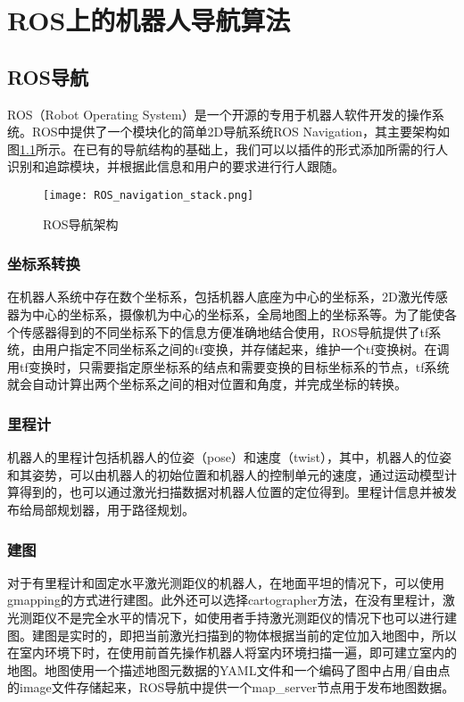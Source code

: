 
\chapter{ROS上的机器人导航算法}

\section{ROS导航}

ROS（Robot Operating System）是一个开源的专用于机器人软件开发的操作系统。ROS中提供了一个模块化的简单2D导航系统ROS Navigation，其主要架构如图\ref{fig:rosnav}所示。在已有的导航结构的基础上，我们可以以插件的形式添加所需的行人识别和追踪模块，并根据此信息和用户的要求进行行人跟随。

\begin{figure}[htb]
  \centering
  \texttt{[image: ROS\_navigation\_stack.png]}
  \caption{ROS导航架构}
  \label{fig:rosnav}
\end{figure}

\subsection{坐标系转换}
  在机器人系统中存在数个坐标系，包括机器人底座为中心的坐标系，2D激光传感器为中心的坐标系，摄像机为中心的坐标系，全局地图上的坐标系等。为了能使各个传感器得到的不同坐标系下的信息方便准确地结合使用，ROS导航提供了tf系统，由用户指定不同坐标系之间的tf变换，并存储起来，维护一个tf变换树。在调用tf变换时，只需要指定原坐标系的结点和需要变换的目标坐标系的节点，tf系统就会自动计算出两个坐标系之间的相对位置和角度，并完成坐标的转换。

\subsection{里程计}
  机器人的里程计包括机器人的位姿（pose）和速度（twist），其中，机器人的位姿和其姿势，可以由机器人的初始位置和机器人的控制单元的速度，通过运动模型计算得到的，也可以通过激光扫描数据对机器人位置的定位得到。里程计信息并被发布给局部规划器，用于路径规划。

\subsection{建图}
  对于有里程计和固定水平激光测距仪的机器人，在地面平坦的情况下，可以使用gmapping\cite{grisetti2007improved}的方式进行建图。此外还可以选择cartographer\cite{hess2016real}方法，在没有里程计，激光测距仪不是完全水平的情况下，如使用者手持激光测距仪的情况下也可以进行建图。建图是实时的，即把当前激光扫描到的物体根据当前的定位加入地图中，所以在室内环境下时，在使用前首先操作机器人将室内环境扫描一遍，即可建立室内的地图。地图使用一个描述地图元数据的YAML文件和一个编码了图中占用/自由点的image文件存储起来，ROS导航中提供一个map\_server节点用于发布地图数据。

